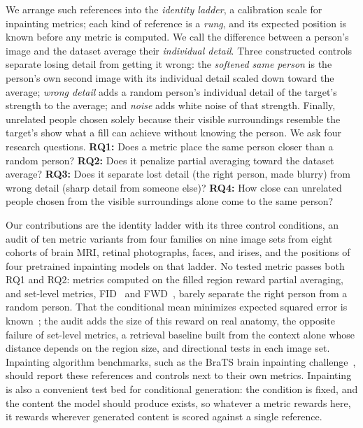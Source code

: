 We arrange such references into the \emph{identity ladder}, a calibration scale for inpainting metrics; each kind of reference is a \emph{rung}, and its expected position is known before any metric is computed.
We call the difference between a person's image and the dataset average their \emph{individual detail}.
Three constructed controls separate losing detail from getting it wrong: the \emph{softened same person} is the person's own second image with its individual detail scaled down toward the average; \emph{wrong detail} adds a random person's individual detail of the target's strength to the average; and \emph{noise} adds white noise of that strength.
Finally, unrelated people chosen solely because their visible surroundings resemble the target's show what a fill can achieve without knowing the person.
We ask four research questions.
\textbf{RQ1:} Does a metric place the same person closer than a random person?
\textbf{RQ2:} Does it penalize partial averaging toward the dataset average?
\textbf{RQ3:} Does it separate lost detail (the right person, made blurry) from wrong detail (sharp detail from someone else)?
\textbf{RQ4:} How close can unrelated people chosen from the visible surroundings alone come to the same person?

Our contributions are the identity ladder with its three control conditions, an audit of ten metric variants from four families on nine image sets from eight cohorts of brain \ac{MRI}, retinal photographs, faces, and irises, and the positions of four pretrained inpainting models on that ladder.
No tested metric passes both RQ1 and RQ2: metrics computed on the filled region reward partial averaging, and set-level metrics, \ac{FID}~\cite{heusel2017fid} and \ac{FWD}~\cite{fwd2025}, barely separate the right person from a random person.
That the conditional mean minimizes expected squared error is known~\cite{blau2018}; the audit adds the size of this reward on real anatomy, the opposite failure of set-level metrics, a retrieval baseline built from the context alone whose distance depends on the region size, and directional tests in each image set.
Inpainting algorithm benchmarks, such as the \ac{BraTS} brain inpainting challenge~\cite{brats2023}, should report these references and controls next to their own metrics.
Inpainting is also a convenient test bed for conditional generation: the condition is fixed, and the content the model should produce exists, so whatever a metric rewards here, it rewards wherever generated content is scored against a single reference.
